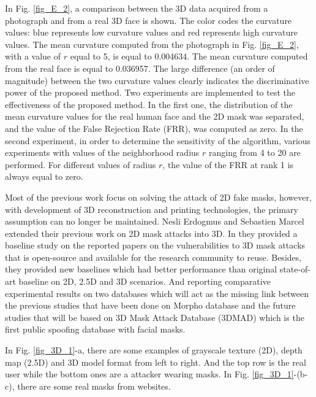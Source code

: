 \documentclass[journal]{IEEEtran}
\begin{document}
In Fig. \ref{fig_E_2}, a comparison between the 3D data acquired from a photograph and from a real 3D face is shown. The color codes the curvature values: blue represents low curvature values and red represents high curvature values. The mean curvature computed from the photograph in Fig. \ref{fig_E_2}, with a value of $r$ equal to 5, is equal to 0.004634. The mean curvature computed from the real face is equal to 0.036957. The large difference (an order of magnitude) between the two curvature values clearly indicates the discriminative power of the proposed method.
Two experiments are implemented to test the effectiveness of the proposed method. In the first one, the distribution of the mean curvature values for the real human face and the 2D mask was separated, and the value of the False Rejection Rate (FRR), was computed as zero. In the second experiment, in order to determine the sensitivity of the algorithm, various experiments with values of the neighborhood radius $r$ ranging from 4 to 20 are performed. For different values of radius $r$, the value of the FRR at rank 1 is always equal to zero.

Most of the previous work focus on solving the attack of 2D fake masks, however, with development of 3D reconstruction and printing technologies, the primary assumption can no longer be maintained. Nesli Erdogmus and Sebastien Marcel extended their previous work \cite{erdogmus2013spoofing} on 2D mask attacks into 3D. In \cite{erdogmus2014spoofing} they provided a baseline study on the reported papers on the vulnerabilities to 3D mask attacks that is open-source and available for the research community to reuse. Besides, they provided new baselines which had better performance than original state-of-art baseline on 2D, 2.5D and 3D scenarios. And reporting comparative experimental results on two databases which will act as the missing link between the previous studies that have been done on Morpho database and the future studies that will be based on 3D Mask Attack Database (3DMAD) which is the first public spoofing database with facial masks.

In Fig. \ref{fig_3D_1}-a, there are some examples of grayscale texture (2D), depth map (2.5D) and 3D model format from left to right. And the top row is the real user while the bottom ones are a attacker wearing masks. In Fig. \ref{fig_3D_1}-(b-c), there are some real masks from websites.
\end{document}

